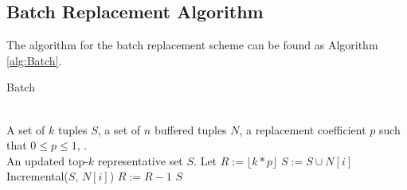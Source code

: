\subsection{Batch Replacement Algorithm}
	The algorithm for the batch replacement scheme can be found as Algorithm \ref{alg:Batch}.
	\begin{algorithm}
		\caption{Batch}
		\label{alg:Batch}
		\begin{algorithmic}[1]
			\REQUIRE ~~\\
			A set of $k$ tuples $S$, a set of $n$ buffered tuples $N$, a replacement coefficient $p$ such that $0 \le p \le 1$, .
			\ENSURE ~~\\
			An updated top-$k$ representative set $S$.
			\STATE Let $R := \lfloor k*p\rfloor$
					\STATE $S := S \cup {N[i]}$
				\ELSE
					\STATE Incremental($S$, $N[i]$)
					\STATE $R := R-1$
				\ENDIF
					\BREAK
				\ENDIF
			\ENDFOR
			\RETURN $S$
		\end{algorithmic}
	\end{algorithm}
